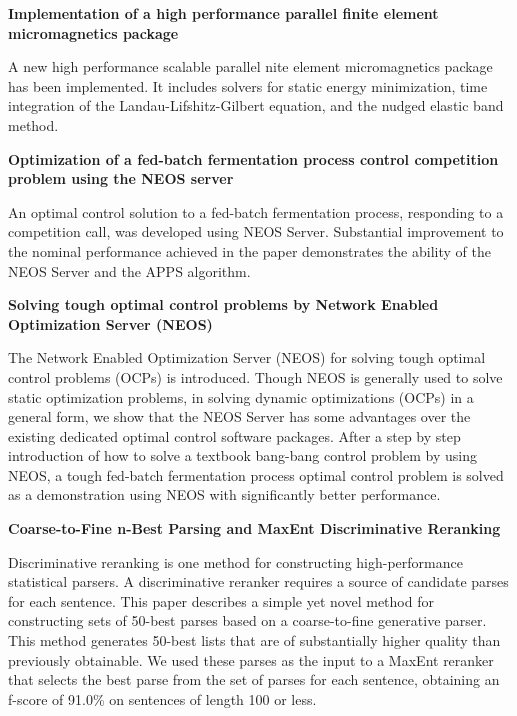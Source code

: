 \documentclass[11pt]{article}
\begin{document}
\bigskip
\noindent
\textbf{Implementation of a high performance parallel finite element
  micromagnetics package}
\cite{scholz03implementation}

\noindent
A new high performance scalable parallel  nite element micromagnetics
package has been implemented. It includes solvers for static energy
minimization, time integration of the Landau-Lifshitz-Gilbert
equation, and the nudged elastic band method.


\bigskip
\noindent
\textbf{Optimization of a fed-batch fermentation process control 
competition problem using the NEOS server}
\cite{liang03optimization}

\noindent
An optimal control solution to a fed-batch fermentation process, 
responding to a competition call, was developed using NEOS Server. 
Substantial improvement to the nominal performance achieved in the 
paper demonstrates the ability of the NEOS Server and the APPS algorithm. 

\bigskip
\noindent
\textbf{Solving tough optimal control problems by Network Enabled Optimization Server (NEOS)}
\cite{liang03solving}

\noindent
The Network Enabled Optimization Server
(NEOS) for solving tough optimal control problems (OCPs) is
introduced. Though NEOS is generally used to solve static optimization
problems, in solving dynamic optimizations (OCPs)
in a general form, we show that the NEOS Server has some
advantages over the existing dedicated optimal control software
packages. After a step by step introduction of how to solve
a textbook bang-bang control problem by using NEOS, a
tough fed-batch fermentation process optimal control problem
is solved as a demonstration using NEOS with significantly
better performance.

\bigskip
\noindent
\textbf{Coarse-to-Fine n-Best Parsing and MaxEnt Discriminative Reranking}
\cite{charniak-johnson:2005:ACL}

\noindent
Discriminative reranking is one method
for constructing high-performance statistical
parsers. A discriminative
reranker requires a source of candidate
parses for each sentence. This paper
describes a simple yet novel method
for constructing sets of 50-best parses
based on a coarse-to-fine generative parser. 
This method generates
50-best lists that are of substantially
higher quality than previously obtainable.
We used these parses as the input to a
MaxEnt reranker that selects the best
parse from the set of parses for each sentence,
obtaining an f-score of 91.0\% on
sentences of length 100 or less.
\end{document}
